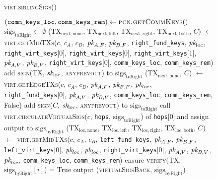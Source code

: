 \begin{figure}[H]
  \begin{processbox}{\textsc{virt.siblingSigs}()}
    \begin{algorithmic}[1]
      \State $(\texttt{comm\_keys\_loc}, \texttt{comm\_keys\_rem}) \gets
      \textsc{pcn.getCommKeys}()$
      \State $\mathrm{sigs}_{\mathrm{toRight}} \gets \emptyset$
       
        \State ($\mathrm{TX}_{\mathrm{next}, \mathrm{none}}$,
        $\mathrm{TX}_{\mathrm{next}, \mathrm{left}}$,
        $\mathrm{TX}_{\mathrm{next}, \mathrm{right}}$,
        $\mathrm{TX}_{\mathrm{next}, \mathrm{both}}$, $C$) $\gets$
        \textsc{virt.getMidTXs}($c$, $c_A$, $c_B$, $\textit{pk}_{A, F}$, $\textit{pk}_{B, F}$,
        \texttt{right\_fund\_keys}, $\textit{pk}_{loc}$,
        \texttt{right\_virt\_keys}[0], \texttt{right\_virt\_keys}[0],
        \texttt{right\_virt\_keys}[1], $\textit{pk}_{A, V}$, $\textit{pk}_{B, V}$,
        \texttt{right\_virt\_keys}[0], \texttt{comm\_keys\_loc},
        \texttt{comm\_keys\_rem})
          \State add \textsc{sign}(TX, $\textit{sk}_{\mathrm{loc}}$,
          \textsc{anyprevout}) to $\mathrm{sigs}_{\mathrm{toRight}}$
        \EndFor
      \Else \: 
        \State ($\mathrm{TX}_{\mathrm{next}, \mathrm{none}}$, $C$) $\gets$
        \textsc{virt.getEdgeTXs}($c$, $c_A$, $c_B$, $\textit{pk}_{A, F}$, $\textit{pk}_{B, F}$,
        $\textit{pk}_{loc}$, \texttt{right\_fund\_keys}[0], $\textit{pk}_{A, V}$, $\textit{pk}_{B, V}$,
        \texttt{comm\_keys\_loc}, \texttt{comm\_keys\_rem}, False)
        \State add \textsc{sign}($C$, $\textit{sk}_{\mathrm{loc}}$, \textsc{anyprevout})
        to $\mathrm{sigs}_{\mathrm{toRight}}$
      \EndIf
      \State call \textsc{virt.circulateVirtualSigs}($c$, \texttt{hops},
      $\mathrm{sigs}_{\mathrm{toRight}}$) of \texttt{hops}[0].\bob and assign
      output to $\mathrm{sigs}_{\mathrm{byRight}}$
      \State ($\mathrm{TX}_{\mathrm{loc}, \mathrm{none}}$,
      $\mathrm{TX}_{\mathrm{loc}, \mathrm{left}}$, $\mathrm{TX}_{\mathrm{loc},
      \mathrm{right}}$, $\mathrm{TX}_{\mathrm{loc}, \mathrm{both}}$, $C$)
      $\gets$ \textsc{virt.getMidTXs}($c$, $c_A$, $c_B$,
      \texttt{left\_fund\_keys}, $\textit{pk}_{A, F}$, $\textit{pk}_{B, F}$,
      \texttt{left\_virt\_keys}[0], $\textit{pk}_{loc}$, $\textit{pk}_{loc}$,
      \texttt{right\_virt\_keys}[0], $\textit{pk}_{A, V}$, $\textit{pk}_{B, V}$, $\textit{pk}_{loc}$,
      \texttt{comm\_keys\_loc}, \texttt{comm\_keys\_rem})
        \State ensure \textsc{verify}(TX, $\mathrm{sigs}_{\mathrm{byRight}}[i]$)
        = True
      \EndFor
      \State output (\textsc{virtualSigsBack},
      $\mathrm{sigs}_{\mathrm{byRight}}$) 
    \end{algorithmic}
  \end{processbox}
  \caption{}
  \label{code:virtual-layer:sibling-sigs}
\end{figure}

